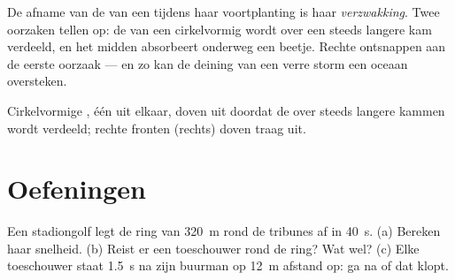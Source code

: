 \begin{definition}[Verzwakking]\label{def:g12:mechanical-waves:attenuation}
De afname van de  van een  tijdens haar voortplanting is haar
\emph{verzwakking}. Twee oorzaken tellen op: de 
van een cirkelvormig  wordt over een steeds langere kam verdeeld,
en het midden absorbeert onderweg een beetje. Rechte  ontsnappen
aan de eerste oorzaak --- en zo kan de deining van een verre storm een
oceaan oversteken.
\end{definition}

\begin{omfigure}

{\small Cirkelvormige , één  uit elkaar, doven uit
doordat de  over steeds langere kammen wordt verdeeld; rechte
fronten (rechts) doven traag uit.}
\end{omfigure}

\section{Oefeningen}

\begin{exercise}[$\star$]\label{exo:g12:mechanical-waves:1}
Een stadiongolf legt de ring van \qty{320}{m} rond de tribunes af in
\qty{40}{s}. (a) Bereken haar snelheid. (b) Reist er een toeschouwer rond
de ring? Wat wel? (c) Elke toeschouwer staat \qty{1.5}{s} na zijn buurman
op \qty{12}{m} afstand op: ga na of dat klopt.
\end{exercise}

